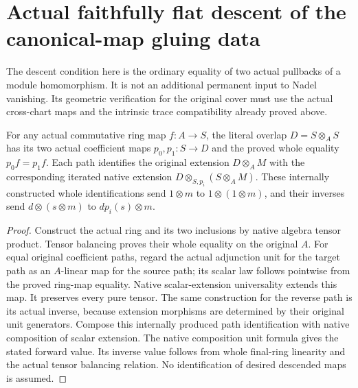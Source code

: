 \section{Actual faithfully flat descent of the canonical-map gluing data}
\label{sec:kn-nadel-faithfully-flat-descent}

The descent condition here is the ordinary equality of two actual
pullbacks of a module homomorphism.  It is not an additional permanent
input to Nadel vanishing.  Its geometric verification for the original
cover must use the actual cross-chart maps and the intrinsic trace
compatibility already proved above.

\begin{lemma}
\label{lem:kn-nadel-faithfully-flat-coefficient-paths}

For any actual commutative ring map $f:A\to S$, the literal overlap
$D=S\otimes_A S$ has its two actual coefficient maps $p_0,p_1:S\to D$
and the proved whole equality $p_0f=p_1f$.  Each path identifies the
original extension $D\otimes_A M$ with the corresponding iterated
native extension $D\otimes_{S,p_i}(S\otimes_A M)$.  These internally
constructed whole identifications send $1\otimes m$ to
$1\otimes(1\otimes m)$, and their inverses send
$d\otimes(s\otimes m)$ to $dp_i(s)\otimes m$.
\end{lemma}
\begin{proof}
Construct the actual ring and its two inclusions by native algebra
tensor product.  Tensor balancing proves their whole equality on
the original $A$.  For equal original coefficient paths, regard the
actual adjunction unit for the target path as an $A$-linear map for
the source path; its scalar law follows pointwise from the proved
ring-map equality.  Native scalar-extension universality extends
this map.  It preserves every pure tensor.  The same construction
for the reverse path is its actual inverse, because extension
morphisms are determined by their original unit generators.
Compose this internally produced path identification with native
composition of scalar extension.  The native composition unit
formula gives the stated forward value.  Its inverse value follows
from whole final-ring linearity and the actual tensor balancing
relation.  No identification of desired descended maps is assumed.
\end{proof}

